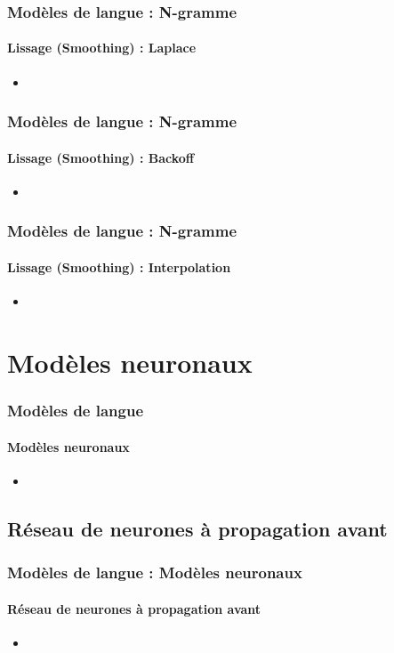 \documentclass[xcolor=table]{beamer}
\begin{document}
\begin{frame}
\frametitle{Modèles de langue : N-gramme}
\framesubtitle{Lissage (Smoothing) : Laplace}

\begin{itemize}
	\item 
\end{itemize}

\end{frame}

\begin{frame}
\frametitle{Modèles de langue : N-gramme}
\framesubtitle{Lissage (Smoothing) : Backoff}

\begin{itemize}
	\item 
\end{itemize}

\end{frame}

\begin{frame}
\frametitle{Modèles de langue : N-gramme}
\framesubtitle{Lissage (Smoothing) : Interpolation}

\begin{itemize}
	\item 
\end{itemize}

\end{frame}


\section{Modèles neuronaux}

\begin{frame}
\frametitle{Modèles de langue}
\framesubtitle{Modèles neuronaux}

\begin{itemize}
	\item 
\end{itemize}

\end{frame}

\subsection{Réseau de neurones à propagation avant}

\begin{frame}
\frametitle{Modèles de langue : Modèles neuronaux}
\framesubtitle{Réseau de neurones à propagation avant}

\begin{itemize}
	\item 
\end{itemize}

\end{frame}
\end{document}
